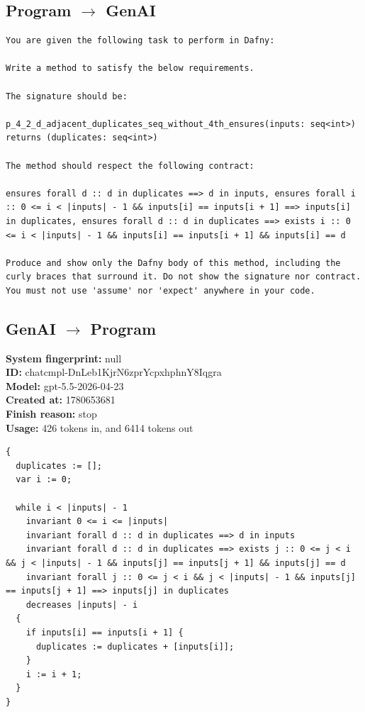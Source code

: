 \documentclass{article}
\begin{document}
\subsection*{Program $\rightarrow$ GenAI}
\begin{lstlisting}
You are given the following task to perform in Dafny:

Write a method to satisfy the below requirements.

The signature should be:

p_4_2_d_adjacent_duplicates_seq_without_4th_ensures(inputs: seq<int>) returns (duplicates: seq<int>)

The method should respect the following contract:

ensures forall d :: d in duplicates ==> d in inputs, ensures forall i :: 0 <= i < |inputs| - 1 && inputs[i] == inputs[i + 1] ==> inputs[i] in duplicates, ensures forall d :: d in duplicates ==> exists i :: 0 <= i < |inputs| - 1 && inputs[i] == inputs[i + 1] && inputs[i] == d

Produce and show only the Dafny body of this method, including the curly braces that surround it. Do not show the signature nor contract. You must not use 'assume' nor 'expect' anywhere in your code.
\end{lstlisting}
\subsection*{GenAI $\rightarrow$ Program}
\textbf{System fingerprint: }null
\\\textbf{ID: }chatcmpl-DnLeb1KjrN6zprYcpxhphnY8Iqgra
\\\textbf{Model: }gpt-5.5-2026-04-23
\\\textbf{Created at: }1780653681
\\\textbf{Finish reason: }stop
\\\textbf{Usage: }426 tokens in, and 6414 tokens out
\begin{lstlisting}
{
  duplicates := [];
  var i := 0;

  while i < |inputs| - 1
    invariant 0 <= i <= |inputs|
    invariant forall d :: d in duplicates ==> d in inputs
    invariant forall d :: d in duplicates ==> exists j :: 0 <= j < i && j < |inputs| - 1 && inputs[j] == inputs[j + 1] && inputs[j] == d
    invariant forall j :: 0 <= j < i && j < |inputs| - 1 && inputs[j] == inputs[j + 1] ==> inputs[j] in duplicates
    decreases |inputs| - i
  {
    if inputs[i] == inputs[i + 1] {
      duplicates := duplicates + [inputs[i]];
    }
    i := i + 1;
  }
}
\end{lstlisting}
\end{document}
